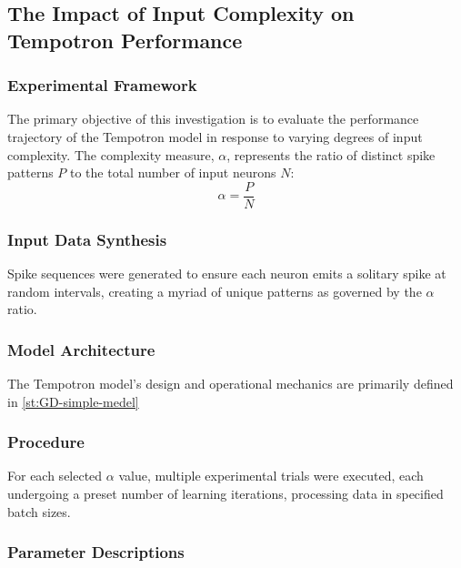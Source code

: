 
\subsection{The Impact of Input Complexity on Tempotron Performance}

\subsubsection{Experimental Framework}

The primary objective of this investigation is to evaluate the performance trajectory of the Tempotron model in response to varying degrees of input complexity. The complexity measure, \( \alpha \), represents the ratio of distinct spike patterns \( P \) to the total number of input neurons \( N \):
\[ \alpha = \frac{P}{N} \]


\subsubsection{Input Data Synthesis}

Spike sequences were generated to ensure each neuron emits a solitary spike at random intervals, creating a myriad of unique patterns as governed by the \( \alpha \) ratio.

\subsubsection{Model Architecture}

The Tempotron model's design and operational mechanics are primarily defined in \ref{st:GD-simple-medel}


\subsubsection{Procedure}

For each selected \( \alpha \) value, multiple experimental trials were executed, each undergoing a preset number of learning iterations, processing data in specified batch sizes.



\subsubsection{Parameter Descriptions}


